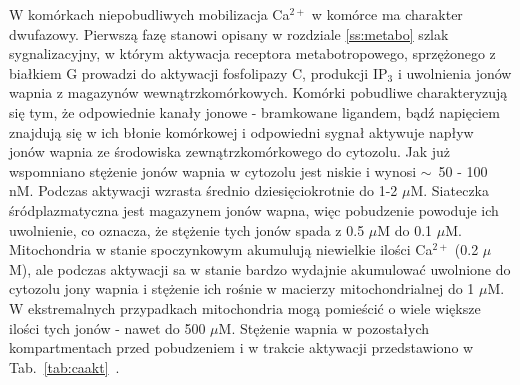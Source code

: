 W komórkach niepobudliwych mobilizacja Ca$^{2+}$ w komórce ma charakter dwufazowy. Pierwszą fazę stanowi opisany w rozdziale \ref{ss:metabo} szlak sygnalizacyjny, w którym aktywacja receptora metabotropowego, sprzężonego z białkiem G prowadzi do aktywacji fosfolipazy C, produkcji IP$_3$ i uwolnienia jonów wapnia z magazynów wewnątrzkomórkowych. Komórki pobudliwe charakteryzują się tym, że odpowiednie kanały jonowe - bramkowane ligandem, bądź napięciem znajdują się w ich błonie komórkowej i odpowiedni sygnał aktywuje napływ jonów wapnia ze środowiska zewnątrzkomórkowego do cytozolu. Jak już wspomniano stężenie jonów wapnia w cytozolu jest niskie i wynosi $\sim$~50 - 100 nM. Podczas aktywacji wzrasta średnio dziesięciokrotnie do 1-2 $\mu$M. Siateczka śródplazmatyczna jest magazynem jonów wapna, więc pobudzenie powoduje ich uwolnienie, co oznacza, że stężenie tych jonów spada z 0.5 $\mu$M do 0.1 $\mu$M. Mitochondria w stanie spoczynkowym akumulują niewielkie ilości Ca$^{2+}$ (0.2 $\mu$M), ale podczas aktywacji sa w stanie bardzo wydajnie akumulować uwolnione do cytozolu jony wapnia i stężenie ich rośnie w macierzy mitochondrialnej do 1 $\mu$M. W ekstremalnych przypadkach mitochondria mogą pomieścić o wiele większe ilości tych jonów - nawet do 500 $\mu$M. Stężenie wapnia w pozostałych kompartmentach przed pobudzeniem i w trakcie aktywacji przedstawiono w Tab.~\ref{tab:caakt}~\cite{Laude2009}. 


